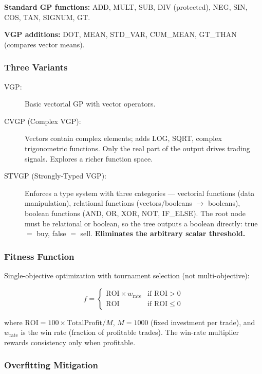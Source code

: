 \documentclass[11pt,a4paper]{article}
\begin{document}
\textbf{Standard GP functions:} ADD, MULT, SUB, DIV (protected), NEG, SIN, COS, TAN, SIGNUM, GT.

\textbf{VGP additions:} DOT, MEAN, STD\_VAR, CUM\_MEAN, GT\_THAN (compares vector means).

\subsubsection{Three Variants}

\begin{description}
    \item[VGP:] Basic vectorial GP with vector operators.
    \item[CVGP (Complex VGP):] Vectors contain complex elements; adds LOG, SQRT, complex trigonometric functions. Only the real part of the output drives trading signals. Explores a richer function space.
    \item[STVGP (Strongly-Typed VGP):] Enforces a type system with three categories --- vectorial functions (data manipulation), relational functions (vectors/booleans $\to$ booleans), boolean functions (AND, OR, XOR, NOT, IF\_ELSE). The root node must be relational or boolean, so the tree outputs a boolean directly: true $=$ buy, false $=$ sell. \textbf{Eliminates the arbitrary scalar threshold.}
\end{description}

\subsubsection{Fitness Function}

Single-objective optimization with tournament selection (not multi-objective):

\begin{equation}
f = \begin{cases} \text{ROI} \times w_{\text{rate}} & \text{if ROI} > 0 \\ \text{ROI} & \text{if ROI} \leq 0 \end{cases}
\end{equation}

where $\text{ROI} = 100 \times \text{TotalProfit} / M$, $M = 1000$ (fixed investment per trade), and $w_{\text{rate}}$ is the win rate (fraction of profitable trades). The win-rate multiplier rewards consistency only when profitable.

\subsubsection{Overfitting Mitigation}
\end{document}

